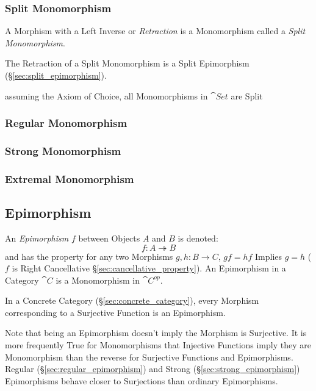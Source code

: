 \subsubsection{Split Monomorphism}\label{sec:split_monomorphism}

A Morphism with a Left Inverse or \emph{Retraction} is a Monomorphism
called a \emph{Split Monomorphism}.

The Retraction of a Split Monomorphism is a Split Epimorphism
(\S\ref{sec:split_epimorphism}).

assuming the Axiom of Choice, all Monomorphisms in $\cat{Set}$ are
Split



\subsubsection{Regular Monomorphism}\label{sec:regular_monomorphism}

\subsubsection{Strong Monomorphism}\label{sec:strong_monomorphism}

\subsubsection{Extremal Monomorphism}\label{sec:extremal_monomorphism}



\subsection{Epimorphism}\label{sec:epimorphism}

An \emph{Epimorphism} $f$ between Objects $A$ and $B$ is denoted:
\[
  f : A \twoheadrightarrow B
\]
and has the property for any two Morphisms $g, h : B \rightarrow C$,
$gf = hf$ Implies $g = h$ ($f$ is Right Cancellative
\S\ref{sec:cancellative_property}). An Epimorphism in a Category
$\cat{C}$ is a Monomorphism in $\cat{C^{op}}$.

In a Concrete Category (\S\ref{sec:concrete_category}), every Morphism
corresponding to a Surjective Function is an Epimorphism.

\fist Note that being an Epimorphism doesn't imply the Morphism
is Surjective. It is more frequently True for Monomorphisms that
Injective Functions imply they are Monomorphism than the reverse for
Surjective Functions and Epimorphisms. Regular
(\S\ref{sec:regular_epimorphism}) and Strong
(\S\ref{sec:strong_epimorphism}) Epimorphisms behave closer to
Surjections than ordinary Epimorphisms.

